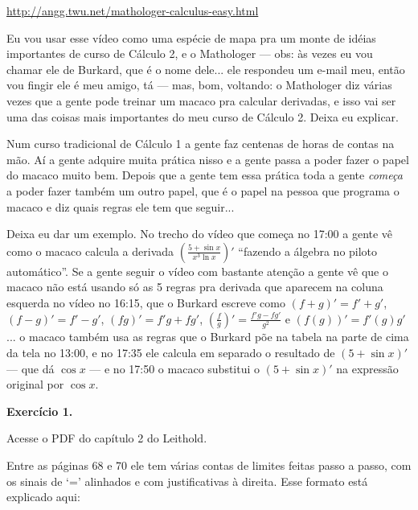 \documentclass[oneside,12pt]{article}
\begin{document}
\ssk

\url{http://angg.twu.net/mathologer-calculus-easy.html}

\ssk

Eu vou usar esse vídeo como uma espécie de mapa pra um monte de idéias
importantes de curso de Cálculo 2, e o Mathologer --- obs: às vezes eu
vou chamar ele de Burkard, que é o nome dele... ele respondeu um
e-mail meu, então vou fingir ele é meu amigo, tá {\smile} --- mas,
bom, voltando: o Mathologer diz várias vezes que a gente pode treinar
um macaco pra calcular derivadas, e isso vai ser uma das coisas mais
importantes do meu curso de Cálculo 2. Deixa eu explicar.

Num curso tradicional de Cálculo 1 a gente faz centenas de horas de
contas na mão. Aí a gente adquire muita prática nisso e a gente passa
a poder fazer o papel do macaco muito bem. Depois que a gente tem essa
prática toda a gente {\sl começa} a poder fazer também um outro papel,
que é o papel na pessoa que programa o macaco e diz quais regras ele
tem que seguir...

Deixa eu dar um exemplo. No trecho do vídeo que começa no 17:00 a
gente vê como o macaco calcula a derivada
$\left(\frac{5+\sin x}{x^3 \ln x}\right)'$ ``fazendo a álgebra no
piloto automático''. Se a gente seguir o vídeo com bastante atenção a
gente vê que o macaco não está usando só as 5 regras pra derivada que
aparecem na coluna esquerda no vídeo no 16:15, que o Burkard escreve
como $(f+g)' = f'+g'$, $(f-g)' = f'-g'$, $(fg)' = f'g + fg'$,
$(\frac{f}{g})' = \frac{f'g-fg'}{g^2}$ e $(f(g))' = f'(g)g'$... o
macaco também usa as regras que o Burkard põe na tabela na parte de
cima da tela no 13:00, e no 17:35 ele calcula em separado o resultado
de $(5 + \sin x)'$ --- que dá $\cos x$ --- e no 17:50 o macaco
substitui o $(5 + \sin x)'$ na expressão original por $\cos x$.


\newpage


{\bf Exercício 1.}

Acesse o PDF do capítulo 2 do Leithold.

Entre as páginas 68 e 70 ele tem várias contas de limites feitas passo
a passo, com os sinais de `=' alinhados e com justificativas à
direita. Esse formato está explicado aqui:
\end{document}

